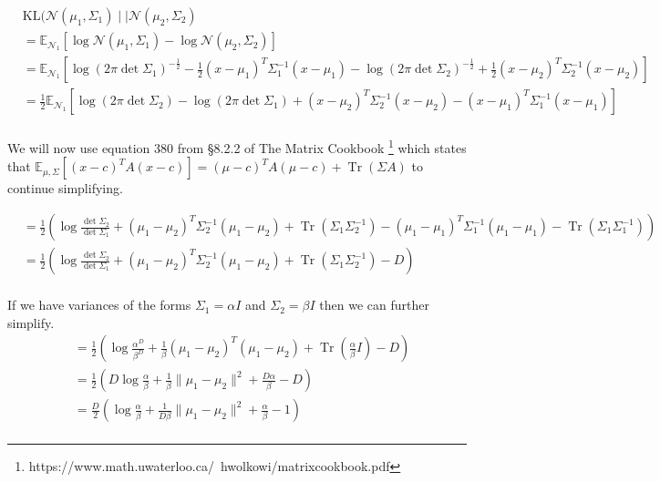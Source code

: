 \documentclass[11pt,dvipsnames]{article}
\DeclareMathOperator{\Tr}{Tr}
\begin{document}
\begin{equation*}
\begin{split}
&\text{KL}(\mathcal{N}(\mu_1, \Sigma_1) \mid\mid \mathcal{N}(\mu_2, \Sigma_2) \\
&= \mathbb{E}_{\mathcal{N}_1} \left[ \log \mathcal{N}(\mu_1, \Sigma_1) - \log \mathcal{N}(\mu_2, \Sigma_2) \right] \\
&= \mathbb{E}_{\mathcal{N}_1} \left[ \log(2\pi\det\Sigma_1)^{-\frac{1}{2}} - \frac{1}{2}(x - \mu_1)^T\Sigma_1^{-1}(x - \mu_1) - \log(2\pi\det\Sigma_2)^{-\frac{1}{2}} + \frac{1}{2}(x - \mu_2)^T\Sigma_2^{-1}(x - \mu_2) \right] \\
&= \frac{1}{2} \mathbb{E}_{\mathcal{N}_1} \left[ \log(2\pi\det\Sigma_2) - \log(2\pi\det\Sigma_1) + (x - \mu_2)^T\Sigma_2^{-1}(x - \mu_2) - (x - \mu_1)^T\Sigma_1^{-1}(x - \mu_1) \right] \\
\end{split}
\end{equation*}

We will now use equation 380 from \S8.2.2 of The Matrix Cookbook \footnote{https://www.math.uwaterloo.ca/~hwolkowi/matrixcookbook.pdf} which states that
$\mathbb{E}_{\mathcal{\mu, \Sigma}} \left[ (x - c)^T A (x - c) \right] = (\mu - c)^T A (\mu - c) + \Tr(\Sigma A)$ to continue simplifying.

\begin{equation*}
\begin{split}
&= \frac{1}{2} \left( \log \frac{\det\Sigma_2}{\det\Sigma_1} + (\mu_1 - \mu_2)^T\Sigma_2^{-1}(\mu_1 - \mu_2) + \Tr(\Sigma_1\Sigma_2^{-1}) - (\mu_1 - \mu_1)^T\Sigma_1^{-1}(\mu_1 - \mu_1) - \Tr(\Sigma_1\Sigma_1^{-1}) \right) \\
&= \frac{1}{2} \left( \log \frac{\det\Sigma_2}{\det\Sigma_1} + (\mu_1 - \mu_2)^T\Sigma_2^{-1}(\mu_1 - \mu_2) + \Tr(\Sigma_1\Sigma_2^{-1}) - D \right) \\
\end{split}
\end{equation*}

If we have variances of the forms $\Sigma_1 = \alpha I$ and $\Sigma_2 = \beta I$ then we can further simplify.
\begin{equation*}
\begin{split}
&= \frac{1}{2} \left( \log \frac{\alpha^D}{\beta^D} + \frac{1}{\beta}(\mu_1 - \mu_2)^T (\mu_1 - \mu_2) + \Tr(\frac{\alpha}{\beta}I) - D \right) \\
&= \frac{1}{2} \left( D \log \frac{\alpha}{\beta} + \frac{1}{\beta} \lVert \mu_1 - \mu_2 \rVert^2 + \frac{D\alpha}{\beta} - D \right) \\
&= \frac{D}{2} \left( \log \frac{\alpha}{\beta} + \frac{1}{D\beta} \lVert \mu_1 - \mu_2 \rVert^2 + \frac{\alpha}{\beta} - 1 \right) \\
\end{split}
\end{equation*}
\end{document}
